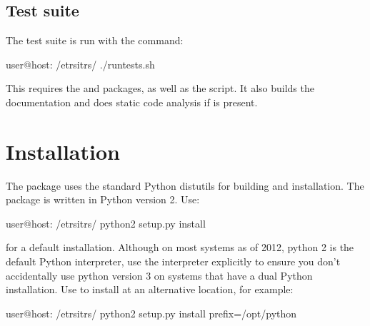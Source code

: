 \documentclass[a4paper,10pt,english]{sphinxmanual}
\begin{document}
\section{Test suite}
\label{\detokenize{readme:test-suite}}
The test suite is run with the command:

\begin{sphinxVerbatim}[commandchars=\\\{\}]
user@host: \PYGZti{}/etrs\PYGZhy{}itrs/\PYGZdl{} ./run\PYGZhy{}tests.sh
\end{sphinxVerbatim}

This requires the  and  packages, as well as the
 script. It also builds the documentation and does
static code analysis if  is present.


\chapter{Installation}
\label{\detokenize{install:installation}}\label{\detokenize{install::doc}}
The  package uses the standard Python distutils for
building and installation. The package is written in Python
version 2. Use:

\begin{sphinxVerbatim}[commandchars=\\\{\}]
user@host: \PYGZti{}/etrs\PYGZhy{}itrs/\PYGZdl{} python2 setup.py install
\end{sphinxVerbatim}

for a default installation. Although on most systems as of 2012,
python 2 is the default Python interpreter, use the 
interpreter explicitly to ensure you don’t accidentally use python
version 3 on systems that have a dual Python installation. Use
 to install at an alternative location, for example:

\begin{sphinxVerbatim}[commandchars=\\\{\}]
user@host: \PYGZti{}/etrs\PYGZhy{}itrs/\PYGZdl{} python2 setup.py install \PYGZhy{}\PYGZhy{}prefix=/opt/python
\end{sphinxVerbatim}
\end{document}
